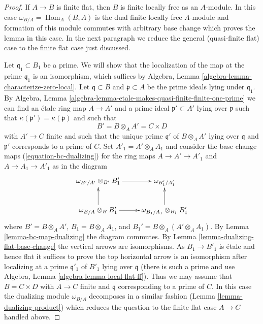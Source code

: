 \documentclass[10pt,a4paper]{amsart}
\theoremstyle{plain}
\theoremstyle{definition}
\theoremstyle{remark}
\numberwithin{equation}{subsection}
\def\Hom{\mathop{\mathrm{Hom}}\nolimits}
\begin{document}
\begin{proof}
If $A \to B$ is finite flat, then $B$ is finite locally free as an $A$-module.
In this case $\omega_{B/A} = \Hom_A(B, A)$ is the dual finite
locally free $A$-module and formation of this module commutes
with arbitrary base change which proves the lemma in this case.
In the next paragraph we reduce the general (quasi-finite flat)
case to the finite flat case just discussed.

\medskip\noindent
Let $\mathfrak q_1 \subset B_1$ be a prime. We will show that the
localization of the map at the prime $\mathfrak q_1$ is an isomorphism, which
suffices by Algebra, Lemma \ref{algebra-lemma-characterize-zero-local}.
Let $\mathfrak q \subset B$ and $\mathfrak p \subset A$ be the prime
ideals lying under $\mathfrak q_1$. By
Algebra, Lemma \ref{algebra-lemma-etale-makes-quasi-finite-finite-one-prime}
we can find an \'etale ring map $A \to A'$ and a prime
ideal $\mathfrak p' \subset A'$ lying over $\mathfrak p$
such that $\kappa(\mathfrak p') = \kappa(\mathfrak p)$ and
such that
$$
B' = B \otimes_A A' = C \times D
$$
with $A' \to C$ finite and such that the unique prime $\mathfrak q'$
of $B \otimes_A A'$ lying over $\mathfrak q$ and $\mathfrak p'$
corresponds to a prime of $C$. Set $A'_1 = A' \otimes_A A_1$ and
consider the base change maps
(\ref{equation-bc-dualizing}) for the ring maps
$A \to A' \to A'_1$ and $A \to A_1 \to A'_1$ as in the diagram
$$
\xymatrix{
\omega_{B'/A'} \otimes_{B'} B'_1 \ar[r] & \omega_{B'_1/A'_1} \\
\omega_{B/A} \otimes_B B'_1 \ar[r] \ar[u] &
\omega_{B_1/A_1} \otimes_{B_1} B'_1 \ar[u]
}
$$
where $B' = B \otimes_A A'$, $B_1 = B \otimes_A A_1$, and
$B_1' = B \otimes_A (A' \otimes_A A_1)$. By
Lemma \ref{lemma-bc-map-dualizing} the diagram commutes. By
Lemma \ref{lemma-dualizing-flat-base-change}
the vertical arrows are isomorphisms.
As $B_1 \to B'_1$ is \'etale and hence flat it suffices
to prove the top horizontal arrow is an isomorphism after localizing
at a prime $\mathfrak q'_1$ of $B'_1$ lying over $\mathfrak q$
(there is such a prime and use
Algebra, Lemma \ref{algebra-lemma-local-flat-ff}).
Thus we may assume that $B = C \times D$ with $A \to C$
finite and $\mathfrak q$ corresponding to a prime of $C$.
In this case the dualizing module $\omega_{B/A}$ decomposes
in a similar fashion (Lemma \ref{lemma-dualizing-product})
which reduces the question
to the finite flat case $A \to C$ handled above.
\end{proof}
\end{document}

